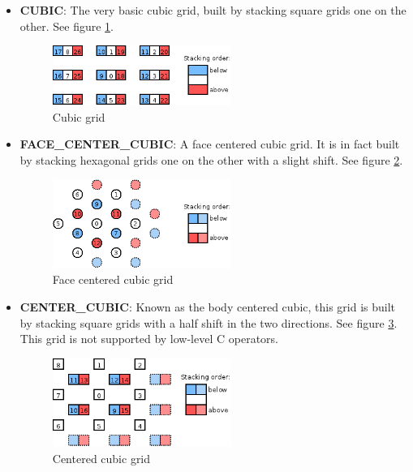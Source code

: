 \documentclass[a4paper,10pt,oneside]{article}
\begin{document}
\begin{itemize}
\item \textbf{CUBIC}: The very basic cubic grid, built by stacking square
grids one on the other. See figure \ref{fig:cubic_grid}.

\begin{figure}
\centering
\includegraphics[width=0.55\textwidth]{figures/cubic_grid.png}
\caption{Cubic grid}
\label{fig:cubic_grid}
\end{figure}

\item \textbf{FACE\_CENTER\_CUBIC}: A face centered cubic grid. It is in fact
built by stacking hexagonal grids one on the other with a slight shift. See
figure \ref{fig:fcc_grid}.

\begin{figure}
\centering
\includegraphics[width=0.55\textwidth]{figures/fcc_grid.png}
\caption{Face centered cubic grid}
\label{fig:fcc_grid}
\end{figure}

\item \textbf{CENTER\_CUBIC}: Known as the body centered cubic, this grid is
built by stacking square grids with a half shift in the two directions. See
figure \ref{fig:ccubic_grid}. This grid is not supported by low-level C
operators.

\begin{figure}
\centering
\includegraphics[width=0.55\textwidth]{figures/ccubic_grid.png}
\caption{Centered cubic grid}
\label{fig:ccubic_grid}
\end{figure}

\end{itemize}
\end{document}
